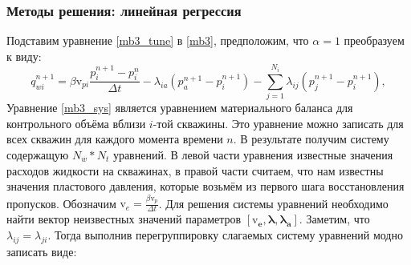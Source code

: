 \documentclass[14pt]{article}
\begin{document}
\subsubsection{Методы решения: линейная регрессия} 
Подставим уравнение \ref{mb3_tune} в \ref{mb3}, предположим, что $\alpha = 1$ преобразуем к виду:
\begin{equation}\label{mb3_sys}
	q_{wi}^{n+1} =  \beta \mathrm{v}_{pi}\frac{p_i^{n+1} - p_i^n}{\Delta t} - \lambda_{ia} \left(p_a^{n+1} - p_i^{n+1}\right) -  \sum_{j=1}^{N_i}\lambda_{ij} \left(p_j^{n+1} - p_i^{n+1}\right),
\end{equation}
Уравнение \ref{mb3_sys} является уравнением материального баланса для контрольного объёма вблизи $i$-той скважины. Это уравнение можно записать для всех скважин для каждого момента времени $n$. В результате получим систему содержащую $N_w * N_t$ уравнений. В левой части уравнения известные значения расходов жидкости на скважинах, в правой части считаем, что нам известны значения пластового давления, которые возьмём из первого шага восстановления пропусков. Обозначим $\mathrm{v}_e = \frac{\beta \mathrm{v}_p}{\Delta t}$. Для решения системы уравнений необходимо найти вектор неизвестных значений параметров $[\boldsymbol{\mathrm{v}_e}, \boldsymbol{\lambda}, \boldsymbol{\lambda_a}]$. Заметим, что $\lambda_{ij} = \lambda_{ji}$. Тогда выполнив перегруппировку слагаемых систему уравнений модно записать виде:
\end{document}
